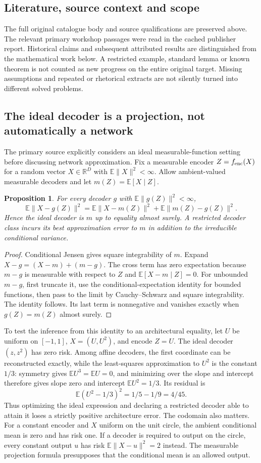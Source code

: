 \documentclass[11pt]{article}
\newtheorem{proposition}{Proposition}
\begin{document}
\subsection{Literature, source context and scope}
The full original catalogue body and source qualifications are preserved above. The relevant primary workshop passages were read in the cached publisher report. Historical claims and subsequent attributed results are distinguished from the mathematical work below. A restricted example, standard lemma or known theorem is not counted as new progress on the entire original target. Missing assumptions and repeated or rhetorical extracts are not silently turned into different solved problems.

\subsection{The ideal decoder is a projection, not automatically a network}
The primary source explicitly considers an ideal measurable-function setting before discussing network approximation. Fix a measurable encoder $Z=f_{\rm enc}(X)$ for a random vector $X\in\mathbb R^D$ with $\mathbb E\|X\|^2<\infty$. Allow ambient-valued measurable decoders and let $m(Z)=\mathbb E[X\mid Z]$.
\begin{proposition}
For every decoder $g$ with $\mathbb E\|g(Z)\|^2<\infty$,
\[
\mathbb E\|X-g(Z)\|^2
=\mathbb E\|X-m(Z)\|^2+\mathbb E\|m(Z)-g(Z)\|^2.
\]
Hence the ideal decoder is $m$ up to equality almost surely. A restricted decoder class incurs its best approximation error to $m$ in addition to the irreducible conditional variance.
\end{proposition}
\begin{proof}
Conditional Jensen gives square integrability of $m$. Expand $X-g=(X-m)+(m-g)$. The cross term has zero expectation because $m-g$ is measurable with respect to $Z$ and $\mathbb E[X-m\mid Z]=0$. For unbounded $m-g$, first truncate it, use the conditional-expectation identity for bounded functions, then pass to the limit by Cauchy--Schwarz and square integrability. The identity follows. Its last term is nonnegative and vanishes exactly when $g(Z)=m(Z)$ almost surely.
\end{proof}
To test the inference from this identity to an architectural equality, let $U$ be uniform on $[-1,1]$, $X=(U,U^2)$, and encode $Z=U$. The ideal decoder $(z,z^2)$ has zero risk. Among affine decoders, the first coordinate can be reconstructed exactly, while the least-squares approximation to $U^2$ is the constant $1/3$: symmetry gives $\mathbb EU^3=\mathbb EU=0$, and minimizing over the slope and intercept therefore gives slope zero and intercept $\mathbb EU^2=1/3$. Its residual is
\[
\mathbb E(U^2-1/3)^2=1/5-1/9=4/45.
\]
Thus optimizing the ideal expression and declaring a restricted decoder able to attain it loses a strictly positive architecture error.
The codomain also matters. For a constant encoder and $X$ uniform on the unit circle, the ambient conditional mean is zero and has risk one. If a decoder is required to output on the circle, every constant output $u$ has risk $\mathbb E\|X-u\|^2=2$ instead. The measurable projection formula presupposes that the conditional mean is an allowed output.
\end{document}
